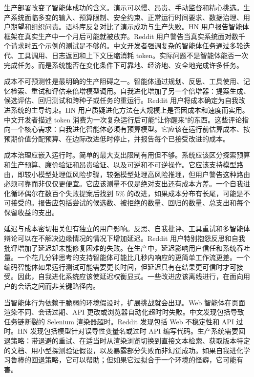 生产部署改变了智能体成功的含义。演示可以慢、昂贵、手动监督和精心挑选。生产系统面临多变的输入、预算限制、安全约束、正常运行时间要求、数据治理、用户期望和组织问责。语料库反复对比了演示成功与生产失败。HN 用户报告智能体框架在真实生产中一个月后可能就被放弃。Reddit 用户警告当真实系统面对数千个请求时五个示例的测试是不够的。中文开发者强调复杂的智能体任务通过多轮迭代、工具调用、日志返回和上下文压缩消耗 token。实际问题不是智能体能否一次完成任务。而是系统能否在变化条件下可靠地、经济地、安全地完成许多任务。

成本不可预测性是最明确的生产阻碍之一。智能体通过规划、反思、工具使用、记忆检索、重试和评估来倍增模型调用。自我进化增加了另一个倍增器：提案生成、候选评估、回归测试和跨种子或任务的重运行。Reddit 用户将成本确定为自我改进系统的主导约束。HN 用户质疑进化方法在大规模上是否因成本和速度而实用。中文开发者描述 token 消费为一次复杂运行后可能"让你醒来"的东西。这些评论指向一个核心需求：自我进化智能体必须有预算模型。它应该在运行前估算成本、按预期价值分配预算、在边际改进低时停止，并报告每个已接受改进的成本。

成本治理应嵌入运行时。简单的最大支出限制有用但不够。系统应该区分探索预算和生产预算、廉价验证和昂贵验证、以及可逆和不可逆操作。它应该支持模型路由，即较小模型处理低风险步骤，较强模型处理高风险推理，但用户警告这种路由必须可靠而非仅仅更便宜。它应该测量不仅是绝对支出还有成本方差。一个自我进化循环偶尔在数百个失败提案后找到 5\% 的改进，如果成本分布有长尾，可能是不可接受的。报告应包括尝试的候选数、被拒绝的数量、回归的数量、总支出和每个保留收益的支出。

延迟与成本密切相关但有独立的用户影响。反思、自我批评、工具重试和多智能体辩论可以在不解决边缘情况的情况下增加延迟。Reddit 用户特别抱怨反思和自我批评增加了延迟却未能修复困难的失败。在生产中，延迟影响用户信任和系统吞吐量。一个花几分钟思考的支持智能体可能比几秒内响应的更简单工作流更差。一个编码智能体如果运行测试可能需要更长时间，但延迟只有在结果更可信时才可接受。因此，自我进化系统应该使延迟权衡显式。一些改进应该离线进行，在面向用户的会话之间而非关键路径内。

当智能体行为依赖于脆弱的环境假设时，扩展挑战就会出现。Web 智能体在页面渲染不同、会话过期、API 更改或浏览器自动化超时时失败。中文发现包括导致任务链断裂的 Selenium 渲染器超时。Reddit 发现包括 Web 不稳定性和 API 过时。HN 发现包括模型针对误导性变量名或过时 API 编写代码。生产系统需要回退策略：带退避的重试、在适当时从渲染浏览切换到直接文本检索、获取版本特定的文档、用小型探测验证假设，以及暴露部分失败而非幻觉成功。如果自我进化学习鲁棒的回退策略，它可以帮助；但如果它过拟合于一个环境的怪癖，它可能有害。

